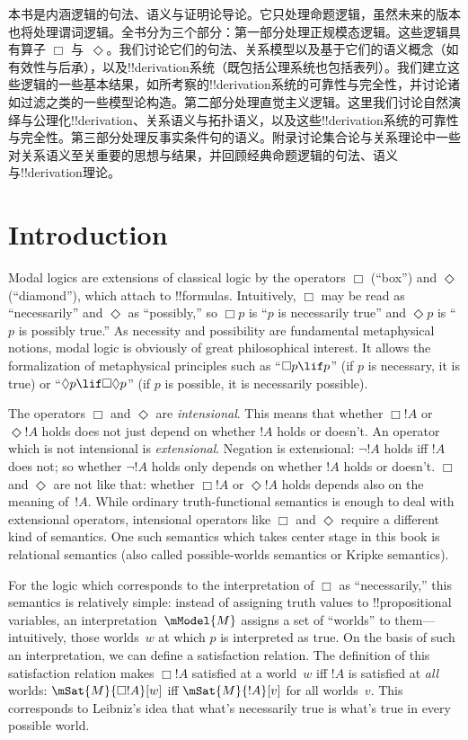 本书是内涵逻辑的句法、语义与证明论导论。它只处理命题逻辑，虽然未来的版本也将处理谓词逻辑。全书分为三个部分：第一部分处理正规模态逻辑。这些逻辑具有算子 $\Box$ 与~$\Diamond$。我们讨论它们的句法、关系模型以及基于它们的语义概念（如有效性与后承），以及!!{derivation}系统（既包括公理系统也包括表列）。我们建立这些逻辑的一些基本结果，如所考察的!!{derivation}系统的可靠性与完全性，并讨论诸如过滤之类的一些模型论构造。第二部分处理直觉主义逻辑。这里我们讨论自然演绎与公理化!!{derivation}、关系语义与拓扑语义，以及这些!!{derivation}系统的可靠性与完全性。第三部分处理反事实条件句的语义。附录讨论集合论与关系理论中一些对关系语义至关重要的思想与结果，并回顾经典命题逻辑的句法、语义与!!{derivation}理论。
\else
\chapter{Introduction}

Modal logics are extensions of classical logic by the operators $\Box$
(``box'') and $\Diamond$ (``diamond''), which attach to !!{formula}s.
Intuitively, $\Box$ may be read as ``necessarily'' and $\Diamond$ as
``possibly,'' so $\Box p$ is ``$p$ is necessarily true'' and $\Diamond
p$ is ``$p$ is possibly true.'' As necessity and possibility are
fundamental metaphysical notions, modal logic is obviously of great
philosophical interest. It allows the formalization of metaphysical
principles such as ``$\Box p \lif p$'' (if $p$ is necessary, it is
true) or ``$\Diamond p \lif \Box\Diamond p$'' (if $p$ is possible,
it is necessarily possible).

The operators $\Box$ and $\Diamond$ are \emph{intensional}. This means
that whether $\Box !A$ or $\Diamond !A$ holds does not just depend on
whether $!A$ holds or doesn't.  An operator which is not intensional
is \emph{extensional}. Negation is extensional: $\lnot !A$ holds iff
$!A$ does not; so whether $\lnot !A$ holds only depends on whether
$!A$ holds or doesn't. $\Box$ and $\Diamond$ are not like that:
whether $\Box !A$ or $\Diamond !A$ holds depends also on the meaning
of~$!A$.  While ordinary truth-functional semantics is enough to deal
with extensional operators, intensional operators like $\Box$ and
$\Diamond$ require a different kind of semantics. One such semantics
which takes center stage in this book is relational semantics (also
called possible-worlds semantics or Kripke semantics). 

For the logic which corresponds to the interpretation of $\Box$ as
``necessarily,'' this semantics is relatively simple: instead of
assigning truth values to !!{propositional variable}s, an
interpretation~$\mModel{M}$ assigns a set of ``worlds'' to
them---intuitively, those worlds~$w$ at which $p$ is interpreted as true.
On the basis of such an interpretation, we can define a satisfaction
relation. The definition of this satisfaction relation makes $\Box !A$ satisfied at a world~$w$ iff $!A$ is
satisfied at \emph{all} worlds: $\mSat{M}{\Box !A}[w]$ iff
$\mSat{M}{!A}[v]$ for all worlds~$v$. This corresponds to Leibniz's
idea that what's necessarily true is what's true in every possible world.

